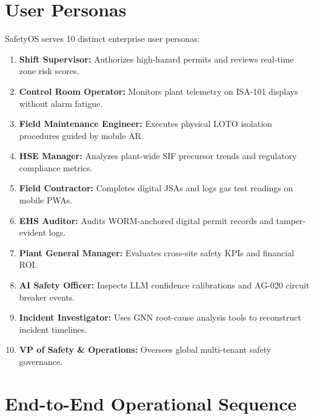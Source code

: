 \documentclass[11pt,a4paper]{article}
\begin{document}
\section{User Personas}
SafetyOS serves 10 distinct enterprise user personas:
\begin{enumerate}
    \item \textbf{Shift Supervisor:} Authorizes high-hazard permits and reviews real-time zone risk scores.
    \item \textbf{Control Room Operator:} Monitors plant telemetry on ISA-101 displays without alarm fatigue.
    \item \textbf{Field Maintenance Engineer:} Executes physical LOTO isolation procedures guided by mobile AR.
    \item \textbf{HSE Manager:} Analyzes plant-wide SIF precursor trends and regulatory compliance metrics.
    \item \textbf{Field Contractor:} Completes digital JSAs and logs gas test readings on mobile PWAs.
    \item \textbf{EHS Auditor:} Audits WORM-anchored digital permit records and tamper-evident logs.
    \item \textbf{Plant General Manager:} Evaluates cross-site safety KPIs and financial ROI.
    \item \textbf{AI Safety Officer:} Inspects LLM confidence calibrations and AG-020 circuit breaker events.
    \item \textbf{Incident Investigator:} Uses GNN root-cause analysis tools to reconstruct incident timelines.
    \item \textbf{VP of Safety \& Operations:} Oversees global multi-tenant safety governance.
\end{enumerate}

\section{End-to-End Operational Sequence}

\end{document}
